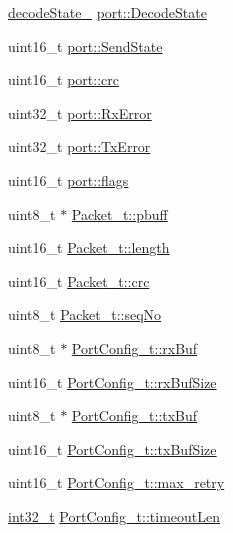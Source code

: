\begin{DoxyCompactItemize}
\item 
\hyperlink{experimental_2_u_s_b___u_p_l_o_a_d___t_o_o_l_2_s_s_p_2common_8h_aca51c380bc924bd9e5d794ce37ec7194}{decode\-State\-\_\-} \hyperlink{group___uploader_gac689b116d4d7c80713d964bd631e9511}{port\-::\-Decode\-State}
\item 
uint16\-\_\-t \hyperlink{group___uploader_ga9eaf6bf50865d1b4f8470110523b9f6b}{port\-::\-Send\-State}
\item 
uint16\-\_\-t \hyperlink{group___uploader_ga6ad77d0d0cc02d7ce86e13041ef33c5e}{port\-::crc}
\item 
uint32\-\_\-t \hyperlink{group___uploader_ga6d92cd4c24b14264e16528a599123db4}{port\-::\-Rx\-Error}
\item 
uint32\-\_\-t \hyperlink{group___uploader_ga9b23351e935a17b3a216b903dabac29c}{port\-::\-Tx\-Error}
\item 
uint16\-\_\-t \hyperlink{group___uploader_gae9ceccbaac142c00a4699e9020d27f4b}{port\-::flags}
\item 
uint8\-\_\-t $\ast$ \hyperlink{group___uploader_gab5babc1942e0edfe9e5f21458ba20048}{Packet\-\_\-t\-::pbuff}
\item 
uint16\-\_\-t \hyperlink{group___uploader_ga0913fea37a151d66203855de5adfe013}{Packet\-\_\-t\-::length}
\item 
uint16\-\_\-t \hyperlink{group___uploader_gacdbb361acbb12c670984915ffd83f70e}{Packet\-\_\-t\-::crc}
\item 
uint8\-\_\-t \hyperlink{group___uploader_ga9f51d41b7233025b207d9a47188a684b}{Packet\-\_\-t\-::seq\-No}
\item 
uint8\-\_\-t $\ast$ \hyperlink{group___uploader_gaf9c6613e85487823c8b69881abf4f4b2}{Port\-Config\-\_\-t\-::rx\-Buf}
\item 
uint16\-\_\-t \hyperlink{group___uploader_ga2f1cf7a3eabee4b4fa51aeedb4e7f708}{Port\-Config\-\_\-t\-::rx\-Buf\-Size}
\item 
uint8\-\_\-t $\ast$ \hyperlink{group___uploader_gafcdd55fafcda334941b490883a8185f7}{Port\-Config\-\_\-t\-::tx\-Buf}
\item 
uint16\-\_\-t \hyperlink{group___uploader_gacc8a53158605f7a72f895d2a80036137}{Port\-Config\-\_\-t\-::tx\-Buf\-Size}
\item 
uint16\-\_\-t \hyperlink{group___uploader_ga780cb1cf13c87035b0715a39dec4981b}{Port\-Config\-\_\-t\-::max\-\_\-retry}
\item 
\hyperlink{glext_8h_a37994e3b11c72957c6f454c6ec96d43d}{int32\-\_\-t} \hyperlink{group___uploader_ga13c21abf5c985cf8f33e4a6ccc45310f}{Port\-Config\-\_\-t\-::timeout\-Len}
\end{DoxyCompactItemize}
